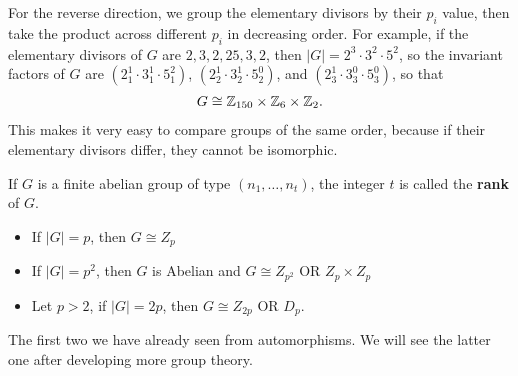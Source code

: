 \documentclass{memoir}
\begin{document}
For the reverse direction, we group the elementary divisors by their \(p_i\) value, then take the product across different \(p_i\) in decreasing order. For example, if the elementary divisors of \(G\) are \(2,3,2,25,3,2\), then \(\left| G \right| = 2^3\cdot 3^2\cdot 5^2\), so the invariant factors of \(G\) are \((2_1^{1}\cdot 3_1^{1}\cdot 5^2_1)\), \((2_2^{1}\cdot 3_2^{1}\cdot 5_2^{0})\), and \((2_3^{1}\cdot 3_3^{0}\cdot 5_3^{0})\), so that
\begin{align*}
	G \cong \mathbb{Z}_{150} \times \mathbb{Z}_6 \times \mathbb{Z}_2.
\end{align*}
This makes it very easy to compare groups of the same order, because if their elementary divisors differ, they cannot be isomorphic.

\begin{defn}[Rank]
	If \(G\) is a finite abelian group of type \((n_1,\ldots,n_t)\), the integer \(t\) is called the \textbf{rank} of \(G\).
\end{defn}

\begin{prop}
	\begin{itemize}
		\item If \(\left| G \right| = p\), then \(G \cong Z_p\)
		\item If \(\left| G \right| =p^2\), then \(G\) is Abelian and \(G \cong Z_{p^2} \text{ OR }Z_p \times Z_p\)
		\item Let \(p>2\), if \(\left| G \right| = 2p\), then \(G \cong Z_{2p} \text{ OR } D_p\).
	\end{itemize}
\end{prop}

The first two we have already seen from automorphisms. We will see the latter one after developing more group theory.

\end{document}
